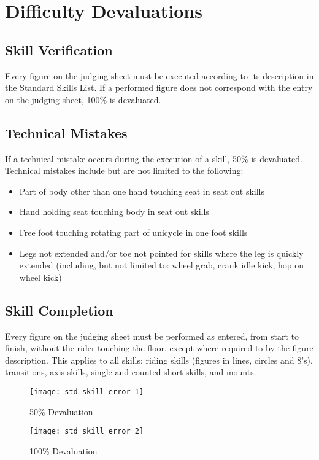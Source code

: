 \section{Difficulty Devaluations}

\subsection{Skill Verification}
Every figure on the judging sheet must be executed according to its description in the Standard Skills List.
If a performed figure does not correspond with the entry on the judging sheet, 100\% is devaluated.

\subsection{Technical Mistakes}
If a technical mistake occurs during the execution of a skill, 50\% is devaluated.
Technical mistakes include but are not limited to the following: 
\begin{itemize}
\item Part of body other than one hand touching seat in seat out skills
\item Hand holding seat touching body in seat out skills
\item Free foot touching rotating part of unicycle in one foot skills
\item Legs not extended and/or toe not pointed for skills where the leg is quickly extended (including, but not limited to: wheel grab, crank idle kick, hop on wheel kick)
\end{itemize}

\subsection{Skill Completion \label{subsec:freestyle_difficulty-devaluations_skill-completion}}
Every figure on the judging sheet must be performed as entered, from start to finish, without the rider touching the floor, except where required to by the figure description.
This applies to all skills: riding skills (figures in lines, circles and 8's), transitions, axis skills, single and counted short skills, and mounts.

\begin{wrapfigure}{l}{0.35\textwidth}
\vspace{-25pt}
\begin{center}
\texttt{[image: std\_skill\_error\_1]}
\end{center}
\vspace{-20pt}
\caption{50\% Devaluation \label{fig:std_skill_error_1}}
\vspace{-5pt}
\begin{center}
\texttt{[image: std\_skill\_error\_2]}
\end{center}
\vspace{-20pt}
\caption{100\% Devaluation\label{fig:std_skill_error_2}}
\vspace{-25pt}
\end{wrapfigure}

